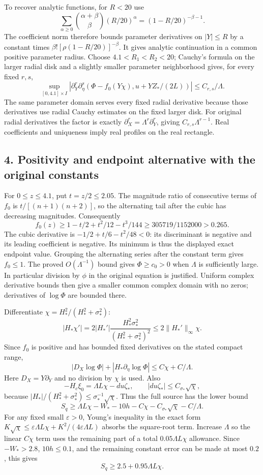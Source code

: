 \documentclass[10pt,a4paper]{article}
\begin{document}
To recover analytic functions, for \(R<20\) use
\[
\sum_{\alpha\ge0}\binom{\alpha+\beta}{\beta}(R/20)^\alpha
=(1-R/20)^{-\beta-1}.
\]
The coefficient norm therefore bounds parameter derivatives on \(|Y|\le R\) by a constant times \(\beta![\rho(1-R/20)]^{-\beta}\). It gives analytic continuation in a common positive parameter radius. Choose \(4.1<R_1<R_2<20\); Cauchy's formula on the larger radial disk and a slightly smaller parameter neighborhood gives, for every fixed \(r,s\),
\[
\sup_{[0,4.1]\times I}
\left|\partial_Y^r\partial_\eta^s(\Phi-f_0(Y\chi),u+YZ_*/(2L))\right|
\le C_{r,s}/\Lambda.
\]
The same parameter domain serves every fixed radial derivative because those derivatives use radial Cauchy estimates on the fixed larger disk. For original radial derivatives the factor is exactly \(\partial_X^r=\Lambda^r\partial_Y^r\), giving \(C_{r,s}\Lambda^{r-1}\). Real coefficients and uniqueness imply real profiles on the real rectangle.

\subsection{4. Positivity and endpoint alternative with the original constants}

For \(0\le z\le4.1\), put \(t=z/2\le2.05\). The magnitude ratio of consecutive terms of \(f_0\) is \(t/[(n+1)(n+2)]\), so the alternating tail after the cubic has decreasing magnitudes. Consequently
\[
f_0(z)\ge1-t/2+t^2/12-t^3/144
\ge305719/1152000>0.265.
\]
The cubic derivative is \(-1/2+t/6-t^2/48<0\): its discriminant is negative and its leading coefficient is negative. Its minimum is thus the displayed exact endpoint value. Grouping the alternating series after the constant term gives \(f_0\le1\). The proved \(O(\Lambda^{-1})\) bound gives \(\Phi\ge c_0>0\) when \(\Lambda\) is sufficiently large. In particular division by \(\phi\) in the original equation is justified. Uniform complex derivative bounds then give a smaller common complex domain with no zeros; derivatives of \(\log\Phi\) are bounded there.

Differentiate \(\chi=H_*^2/(H_*^2+\sigma_*^2)\):
\[
|H_*\chi'|=2|H_*'|\frac{H_*^2\sigma_*^2}{(H_*^2+\sigma_*^2)^2}
\le2\|H_*'\|_\infty\chi.
\]
Since \(f_0\) is positive and has bounded fixed derivatives on the stated compact range,
\[
|D_X\log\Phi|+|H_*\partial_\eta\log\Phi|
\le C\chi+C/\Lambda.
\]
Here \(D_X=Y\partial_Y\) and no division by \(\chi\) is used. Also
\[
-H_c\xi_0=\Lambda L\chi-du\zeta_*,\qquad
|du\zeta_*|\le C_{\sigma_*}\sqrt\chi,
\]
because \(|H_*|/(H_*^2+\sigma_*^2)\le\sigma_*^{-1}\sqrt\chi\). Thus the full source has the lower bound
\[
S_q\ge\Lambda L\chi-W_*-10h-C\chi-C_{\sigma_*}\sqrt\chi-C/\Lambda.
\]
For any fixed small \(\varepsilon>0\), Young's inequality in the exact form
\(K\sqrt\chi\le\varepsilon\Lambda L\chi+K^2/(4\varepsilon\Lambda L)\)
absorbs the square-root term. Increase \(\Lambda\) so the linear \(C\chi\) term uses the remaining part of a total \(0.05\Lambda L\chi\) allowance. Since \(-W_*>2.8\), \(10h\le0.1\), and the remaining constant error can be made at most \(0.2\), this gives
\[
S_q\ge2.5+0.95\Lambda L\chi.
\]
\end{document}
